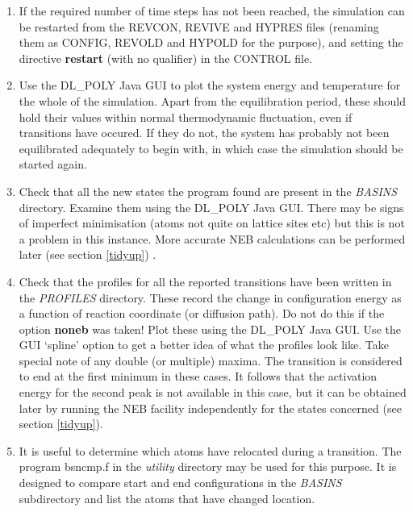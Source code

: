 \begin{enumerate}
\begin{enumerate}
  system\footnote{Assuming just one atom undergoes the transition!}) this
  represents a violation of the condition in equation (\ref{votcon}), which
  means the observed diffusion path is not a valid representation of the
  original system. The simulation should be repeated with a lower value of
  $E_{bias}$.
\item If the required number of time steps has not been reached, the
  simulation can be restarted from the REVCON, REVIVE and HYPRES files
  (renaming them as CONFIG, REVOLD and HYPOLD for the purpose), and
  setting the directive {\bf restart} (with no qualifier) in the CONTROL
  file.
\item Use the DL\_POLY Java GUI to plot the system energy and temperature
  for the whole of the simulation. Apart from the equilibration
  period, these should hold their values within normal thermodynamic
  fluctuation, even if transitions have occured. If they do not, the
  system has probably not been equilibrated adequately to begin with,
  in which case the simulation should be started again.
\item Check that all the new states the program found are present in 
  the {\em BASINS} directory. Examine them using the DL\_POLY Java
  GUI. There may be signs of imperfect minimisation (atoms not quite
  on lattice sites etc) but this is not a problem in this instance.
  More accurate NEB calculations can be performed later (see section
  \ref{tidyup}) .
\item Check that the profiles for all the reported transitions have been
  written in the {\em PROFILES} directory. These record the change in
  configuration energy as a function of reaction coordinate (or
  diffusion path). Do not do this if the option {\bf noneb} was taken!
  Plot these using the DL\_POLY Java GUI. Use the GUI `spline' option
  to get a better idea of what the profiles look like. Take special
  note of any double (or multiple) maxima. The transition is
  considered to end at the first minimum in these cases. It follows
  that the activation energy for the second peak is not available in
  this case, but it can be obtained later by running the NEB facility
  independently for the states concerned (see section \ref{tidyup}).
\item It is useful to determine which atoms have relocated during a
  transition. The program bsncmp.f in the {\em  utility} directory 
  may be used for this purpose. It is designed to compare start and 
  end configurations in the {\em BASINS} subdirectory and list the 
  atoms that have changed location.
\end{enumerate}
\end{enumerate}

